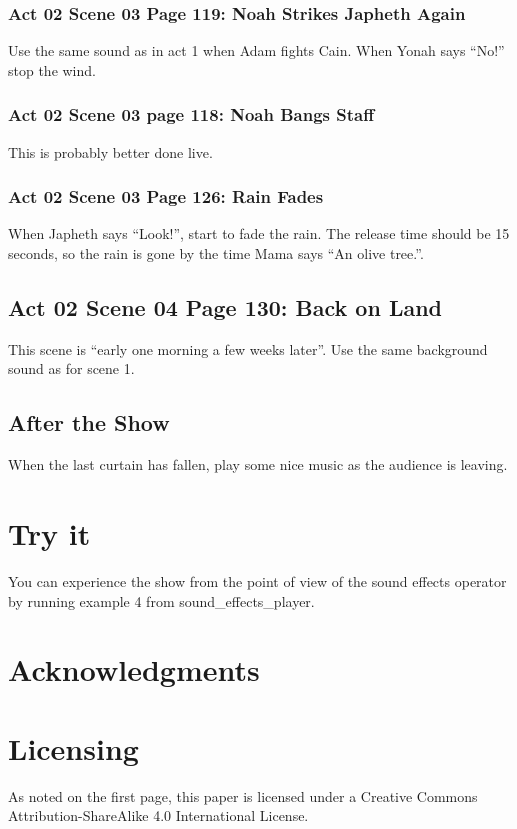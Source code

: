 \documentclass[letterpaper,twoside]{article}
\begin{document}
\subsubsection{Act 02 Scene 03 Page 119: Noah Strikes Japheth Again}
Use the same sound as in act 1 when Adam fights Cain.
When Yonah says ``No!'' stop the wind.

\subsubsection{Act 02 Scene 03 page 118: Noah Bangs Staff}
This is probably better done live.

\subsubsection{Act 02 Scene 03 Page 126: Rain Fades}
When Japheth says ``Look!'', start to fade the rain.
The release time should be 15 seconds, so the rain is gone
by the time Mama says ``An olive tree.''.

\subsection{Act 02 Scene 04 Page 130: Back on Land}
This scene is ``early one morning a few weeks later''.
Use the same background sound as for scene 1.

\subsection{After the Show}
When the last curtain has fallen, play some nice music as the audience
is leaving.

\section{Try it}
You can experience the show from the point of view of the sound
effects operator by running example 4 from sound\_effects\_player.
  
\section{Acknowledgments}
  
\newpage

\section{Licensing}
\label{section:Licensing}
As noted on the first page, this paper is licensed under a Creative
Commons Attribution-ShareAlike 4.0 International License.
\end{document}
